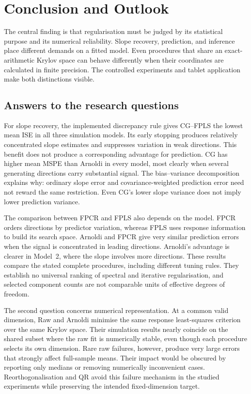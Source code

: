 \chapter{Conclusion and Outlook}
\label{chap:main-conclusion}
\label{chap:conclusion}

The central finding is that regularisation must be judged by its statistical
purpose and its numerical reliability. Slope recovery, prediction, and
inference place different demands on a fitted model. Even procedures that
share an exact-arithmetic Krylov space can behave differently when their
coordinates are calculated in finite precision. The controlled experiments
and tablet application make both distinctions visible.

\section{Answers to the research questions}

For slope recovery, the implemented discrepancy rule gives CG--FPLS the
lowest mean ISE in all three simulation models. Its early stopping produces
relatively concentrated slope estimates and suppresses variation in weak
directions. This benefit does not produce a corresponding advantage for
prediction. CG has higher mean MSPE than Arnoldi in every model, most clearly
when several generating directions carry substantial signal. The
bias--variance decomposition explains why: ordinary slope error and
covariance-weighted prediction error need not reward the same restriction.
Even CG's lower slope variance does not imply lower prediction variance.

The comparison between FPCR and FPLS also depends on the model. FPCR orders
directions by predictor variation, whereas FPLS uses response information
to build its search space. Arnoldi and FPCR give very similar prediction
errors when the signal is concentrated in leading directions. Arnoldi's
advantage is clearer in Model~2, where the slope involves more directions.
These results compare the stated complete procedures, including different
tuning rules. They establish no universal ranking of spectral and iterative
regularisation, and selected component counts are not comparable units of
effective degrees of freedom.

The second question concerns numerical representation. At a common valid
dimension, Raw and Arnoldi minimise the same response least-squares
criterion over the same Krylov space. Their simulation results nearly
coincide on the shared subset where the raw fit is numerically stable,
even though each procedure selects its own dimension. Rare raw failures,
however, produce very large errors that strongly affect full-sample means.
Their impact would be obscured by reporting only medians or removing
numerically inconvenient cases. Reorthogonalisation and QR avoid this
failure mechanism in the studied experiments while preserving the intended
fixed-dimension target.

